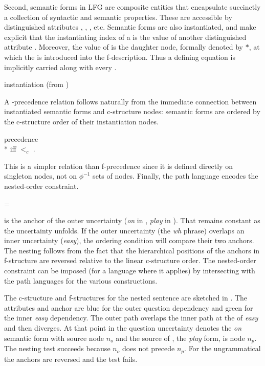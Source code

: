 \documentclass[output=paper,hidelinks]{langscibook}
\begin{document}
Second, \PRED semantic forms in LFG are composite entities that encapsulate succinctly a collection of syntactic and semantic properties.  These are accessible by distinguished attributes , , , etc.  Semantic forms are also instantiated, and      make explicit that the instantiating index of a \PRED is the value of another distinguished attribute .  Moreover, the value of  is the daughter node, formally denoted by $*$, at which the \PRED is introduced into the f-description.  Thus a defining equation  is implicitly carried along with every \PRED.

\ea\label{predinst} \PRED instantiation (from ) \\
\z

\largerpage[-2]
\noindent A \PRED-precedence relation  follows naturally from the immediate connection between instantiated semantic forms and c-structure nodes: semantic forms are ordered by the c-structure order of their instantiation  nodes.

\ea \label{p-prec} precedence\\*
 iff  $<_c$ .
\z

\noindent This is a simpler relation than f-precedence since it is defined directly on singleton nodes, not on $\phi^{-1}$ sets of nodes. Finally, the path language  encodes the nested-order constraint.

\ea\label{anchornest}
 = 
\z

\noindent  {} is the anchor of the outer uncertainty (\textit{on} in , \textit{play} in ). That remains constant as the uncertainty unfolds.  If the outer uncertainty (the \textit{wh} phrase) overlaps an inner uncertainty (\textit{easy}), the ordering condition will compare their two anchors.  The nesting follows from the fact that the hierarchical positions of the anchors in f-structure are reversed relative to the linear c-structure order.  The nested-order constraint can be imposed (for a language where it applies) by intersecting  with the path languages for the various constructions.

The c-structure and f-structures for the nested sentence  are sketched in . The attributes and anchor are blue for the outer question dependency and green for the inner \textit{easy} dependency.  The outer path overlaps the inner path at the  of \textit{easy} and then diverges. At that point  in the question uncertainty denotes the \textit{on} semantic form with source node {\color{lsMidBlue} $n_o$} and  the source of , the \textit{play} form, is node {\color{lsMidGreen} $n_p$}.  The nesting test succeeds because {\color{lsMidBlue} $n_o$} does not precede {\color{lsMidGreen} $n_p$}. For the ungrammatical  the anchors are reversed  and the test fails.
 
\end{document}
